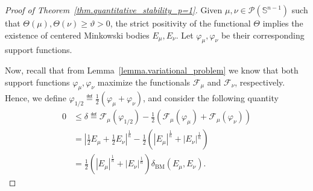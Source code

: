 \documentclass[a4paper, 10pt, twoside]{amsart}
\numberwithin{equation}{section}
\theoremstyle{plain}
\theoremstyle{definition}
\DeclareMathOperator{\BM}{\mathrm{BM}}
\begin{document}
\begin{proof}[Proof of Theorem~\ref{thm.quantitative_stability_p=1}]
    Given $\mu,\nu \in \mathscr{P}(\mathbb{S}^{n-1})$ such that $\Theta(\mu),\Theta(\nu) \ge \vartheta > 0$, the strict positivity of the functional $\Theta$ implies the existence of centered Minkowski bodies $E_\mu,E_\nu$. Let $\varphi_\mu, \varphi_\nu$ be their corresponding support functions.  

    Now, recall that from Lemma~\ref{lemma.variational_problem} we know that both support functions $\varphi_\mu, \varphi_\nu$ maximize the functionals $\mathscr{F}_\mu$ and $\mathscr{F}_\nu$, respectively. Hence, we define $\varphi_{1/2} \eqdef \frac{1}{2}(\varphi_\mu + \varphi_\nu)$, and consider the following quantity
    \begin{equation}\label{eq.def_delta}
        \begin{aligned}
            0 
            &\le \delta \eqdef 
            \mathscr{F}_\mu(\varphi_{1/2}) 
            - 
            \frac{1}{2}\left(
                \mathscr{F}_\mu(\varphi_{\mu}) + \mathscr{F}_\mu(\varphi_{\nu})
            \right)\\ 
            &= 
            {\left|\frac{1}{2}E_\mu + \frac{1}{2}E_\nu\right|}^{\frac{1}{n}} 
            - 
            \frac{1}{2}\left(
                |E_\mu|^{\frac{1}{n}} + |E_\nu|^{\frac{1}{n}}
            \right)\\ 
            &= 
            \frac{1}{2}\left(
                |E_\mu|^{\frac{1}{n}} + |E_\nu|^{\frac{1}{n}}
            \right) 
            \delta_{\BM}(E_\mu,E_\nu).
        \end{aligned}
    \end{equation}


\end{proof}
\end{document}
